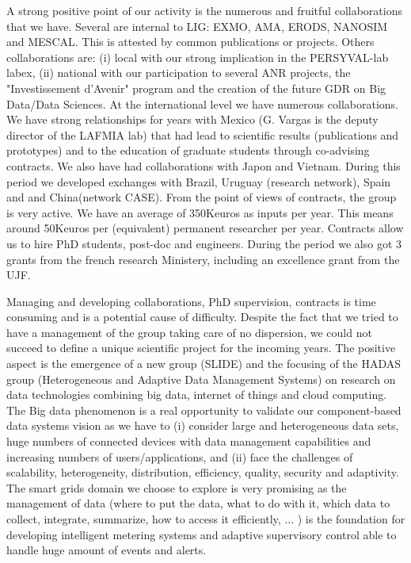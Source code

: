 A strong positive point of our activity is the numerous and fruitful collaborations that we have. Several are internal to LIG: EXMO, AMA, ERODS, NANOSIM and MESCAL. This is attested by common publications or projects. Others collaborations are: (i)  local with our strong implication in the PERSYVAL-lab labex, (ii) national with our participation to several ANR projects, the "Investissement d'Avenir" program and the creation of the future GDR on Big Data/Data Sciences. 
At the international level we have numerous  collaborations.  We have strong relationships for years with Mexico (G. Vargas is the deputy director of the LAFMIA lab) that had lead to scientific results (publications and prototypes) and to the education of graduate students through co-advising contracts. We also have had collaborations with Japon and Vietnam. During this period we developed exchanges with Brazil, Uruguay (research network), Spain and and China(network CASE).  
From the point of views of contracts, the group is very active. We have an average of 350Keuros as inputs per year. This means around 50Keuros per (equivalent) permanent researcher per year. Contracts allow us to hire PhD students, post-doc and engineers. During the period we also got 3 grants from the french research Ministery, including an excellence grant from the UJF. 


Managing and developing collaborations, PhD supervision, contracts is time consuming and is a potential cause of difficulty. Despite the fact that we tried to have a management of the group taking care of no dispersion, we could not succeed to define a unique  scientific project for the incoming years. The positive aspect is the emergence of a new group (SLIDE) and the focusing of the HADAS group (Heterogeneous and Adaptive Data Management Systems) on research on data technologies combining big data, internet of things and  cloud computing. 
The Big data phenomenon is a real opportunity to validate our component-based data systems vision as we have to (i) consider large and heterogeneous data sets, huge numbers of connected devices with data management capabilities and increasing numbers of users/applications,  and (ii) face the challenges of scalability,  heterogeneity, distribution, efficiency, quality, security and adaptivity. 
The smart grids domain we choose to explore is very promising as the management of data (where to put the data, what to do with it, which data to collect,  integrate, summarize, how to access it efficiently, ... ) is the foundation for developing intelligent metering systems and adaptive supervisory control able to handle huge amount of events and alerts.  

